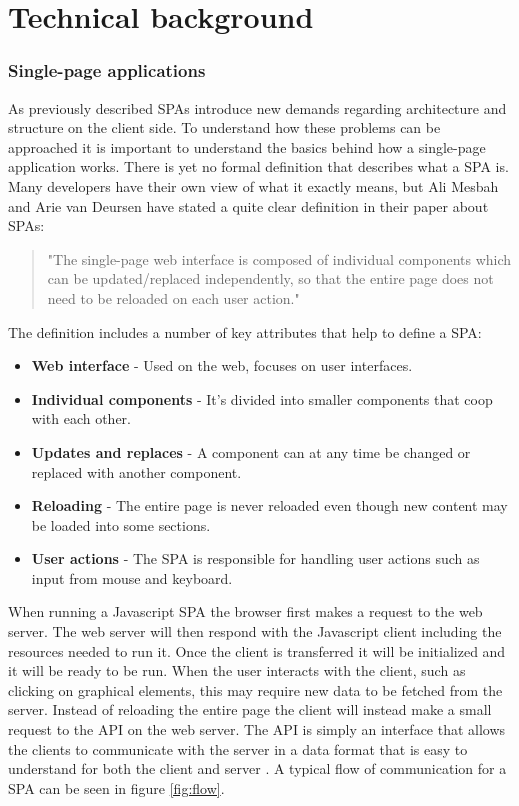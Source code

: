\chapter{Technical background}

\setcounter{section}{2}
\setcounter{subsection}{0}

\subsection{Single-page applications}

As previously described SPAs introduce new demands regarding architecture and structure on the client side. To understand how these problems can be approached it is important to understand the basics behind how a single-page application works. There is yet no formal definition that describes what a SPA is. Many developers have their own view of what it exactly means, but Ali Mesbah and Arie van Deursen \cite{spa_def} have stated a quite clear definition in their paper about SPAs:

\begin{quote}
"The single-page web interface is composed of individual components which can be updated/replaced independently, so that the entire page does not need to be reloaded on each user action."
\end{quote}

The definition includes a number of key attributes that help to define a SPA:

\begin{itemize}
	\item {\bf Web interface} - Used on the web, focuses on user interfaces.
	\item {\bf Individual components} - It's divided into smaller components that coop with each other.
	\item {\bf Updates and replaces} - A component can at any time be changed or replaced with another component.
	\item {\bf Reloading} - The entire page is never reloaded even though new content may be loaded into some sections.
	\item {\bf User actions} - The SPA is responsible for handling user actions such as input from mouse and keyboard.
\end{itemize}

When running a Javascript SPA the browser first makes a request to the web server. The web server will then respond with the Javascript client including the resources needed to run it. Once the client is transferred it will be initialized and it will be ready to be run. When the user interacts with the client, such as clicking on graphical elements, this may require new data to be fetched from the server. Instead of reloading the entire page the client will instead make a small request to the API on the web server. The API is simply an interface that allows the clients to communicate with the server in a data format that is easy to understand for both the client and server \cite{grb_wapi_rest}. A typical flow of communication for a SPA can be seen in figure \ref{fig:flow}.

